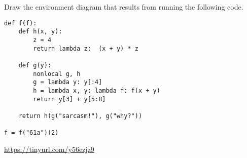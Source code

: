 \begin{blocksection}
\question Draw the environment diagram that results from running the following code.
\begin{lstlisting}
def f(f):
    def h(x, y):
        z = 4
        return lambda z:  (x + y) * z
  
    def g(y):
        nonlocal g, h
        g = lambda y: y[:4]
        h = lambda x, y: lambda f: f(x + y)
        return y[3] + y[5:8]

    return h(g("sarcasm!"), g("why?"))

f = f("61a")(2)
\end{lstlisting}

\begin{solution}[1in]
\url{https://tinyurl.com/y56ezjz9}
\end{solution}
\end{blocksection}


